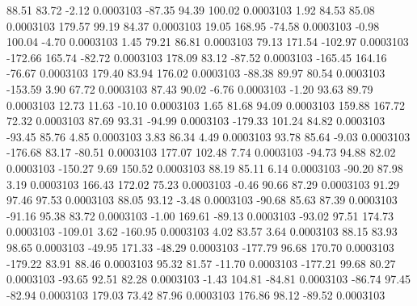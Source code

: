        88.51       83.72       -2.12     0.0003103
      -87.35       94.39      100.02     0.0003103
        1.92       84.53       85.08     0.0003103
      179.57       99.19       84.37     0.0003103
       19.05      168.95      -74.58     0.0003103
       -0.98      100.04       -4.70     0.0003103
        1.45       79.21       86.81     0.0003103
       79.13      171.54     -102.97     0.0003103
     -172.66      165.74      -82.72     0.0003103
      178.09       83.12      -87.52     0.0003103
     -165.45      164.16      -76.67     0.0003103
      179.40       83.94      176.02     0.0003103
      -88.38       89.97       80.54     0.0003103
     -153.59        3.90       67.72     0.0003103
       87.43       90.02       -6.76     0.0003103
       -1.20       93.63       89.79     0.0003103
       12.73       11.63      -10.10     0.0003103
        1.65       81.68       94.09     0.0003103
      159.88      167.72       72.32     0.0003103
       87.69       93.31      -94.99     0.0003103
     -179.33      101.24       84.82     0.0003103
      -93.45       85.76        4.85     0.0003103
        3.83       86.34        4.49     0.0003103
       93.78       85.64       -9.03     0.0003103
     -176.68       83.17      -80.51     0.0003103
      177.07      102.48        7.74     0.0003103
      -94.73       94.88       82.02     0.0003103
     -150.27        9.69      150.52     0.0003103
       88.19       85.11        6.14     0.0003103
      -90.20       87.98        3.19     0.0003103
      166.43      172.02       75.23     0.0003103
       -0.46       90.66       87.29     0.0003103
       91.29       97.46       97.53     0.0003103
       88.05       93.12       -3.48     0.0003103
      -90.68       85.63       87.39     0.0003103
      -91.16       95.38       83.72     0.0003103
       -1.00      169.61      -89.13     0.0003103
      -93.02       97.51      174.73     0.0003103
     -109.01        3.62     -160.95     0.0003103
        4.02       83.57        3.64     0.0003103
       88.15       83.93       98.65     0.0003103
      -49.95      171.33      -48.29     0.0003103
     -177.79       96.68      170.70     0.0003103
     -179.22       83.91       88.46     0.0003103
       95.32       81.57      -11.70     0.0003103
     -177.21       99.68       80.27     0.0003103
      -93.65       92.51       82.28     0.0003103
       -1.43      104.81      -84.81     0.0003103
      -86.74       97.45      -82.94     0.0003103
      179.03       73.42       87.96     0.0003103
      176.86       98.12      -89.52     0.0003103
